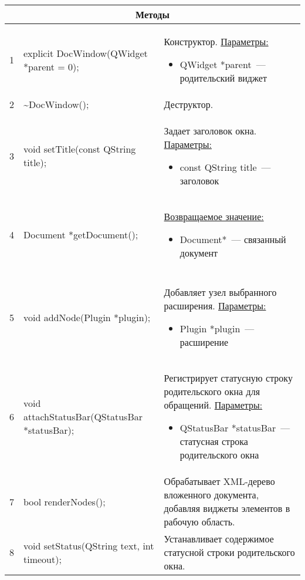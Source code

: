 \begin{longtable}[h]{|p{}|p{}|p{}|}
  \multicolumn{3}{|c|}{\textbf{Методы}} \\
  \hline
  1 & explicit DocWindow(QWidget *parent = 0); &
    Конструктор.\newline
    \uline{Параметры:}
    \begin{itemize}[nolistsep,label=,leftmargin=0cm]
      \item QWidget *parent~--- родительский виджет
    \end{itemize}\\ \hline
  2 & \textasciitilde DocWindow(); & Деструктор. \\ \hline
  3 & void setTitle(const QString title); & Задает заголовок окна.\newline
    \uline{Параметры:}
    \begin{itemize}[nolistsep,label=,leftmargin=0cm]
      \item const QString title~--- заголовок
    \end{itemize}\\ \hline
  4 & Document *getDocument(); & \uline{Возвращаемое значение:}
    \begin{itemize}[nolistsep,label=,leftmargin=0cm]
      \item Document*~--- связанный документ
    \end{itemize}\\ \hline\\ \hline
  5 & void addNode(Plugin *plugin); & Добавляет узел выбранного расширения.\newline
    \uline{Параметры:}
    \begin{itemize}[nolistsep,label=,leftmargin=0cm]
      \item Plugin *plugin~--- расширение
    \end{itemize}\\ \hline
  6 & void attachStatusBar(QStatusBar *statusBar); & Регистрирует статусную строку родительского окна для обращений.\newline
    \uline{Параметры:}
    \begin{itemize}[nolistsep,label=,leftmargin=0cm]
      \item QStatusBar *statusBar~--- статусная строка родительского окна
    \end{itemize}\\ \hline
  7 & bool renderNodes(); & Обрабатывает XML-дерево вложенного документа, добавляя виджеты элементов в рабочую область. \\ \hline
  8 & void setStatus(QString text, int timeout); & Устанавливает содержимое статусной строки родительского окна.\newline

\end{longtable}
